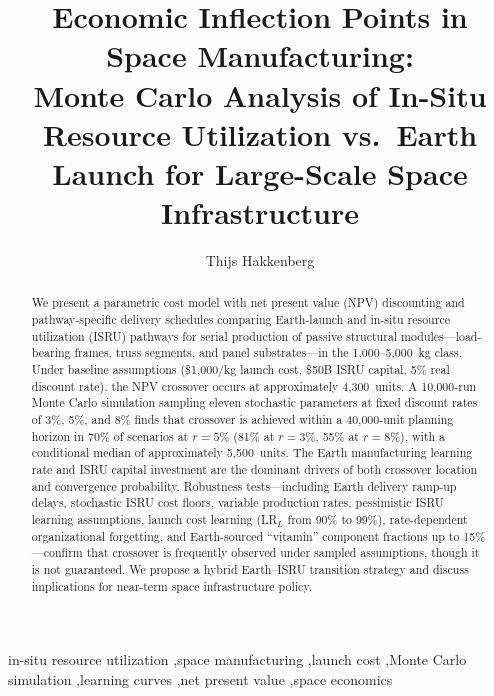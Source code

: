 \documentclass[preprint,12pt]{elsarticle}
\begin{document}
\begin{frontmatter}

\title{Economic Inflection Points in Space Manufacturing:\\ Monte Carlo Analysis of In-Situ Resource Utilization vs.\ Earth Launch for Large-Scale Space Infrastructure}

\author[dyson]{Thijs Hakkenberg}

\address[dyson]{Project Dyson, Open Research Initiative}

\begin{abstract}
We present a parametric cost model with net present value (NPV) discounting and pathway-specific delivery schedules comparing Earth-launch and in-situ resource utilization (ISRU) pathways for serial production of passive structural modules---load-bearing frames, truss segments, and panel substrates---in the 1{,}000--5{,}000~kg class. Under baseline assumptions (\$1{,}000/kg launch cost, \$50B ISRU capital, 5\% real discount rate), the NPV crossover occurs at approximately 4{,}300~units. A 10{,}000-run Monte Carlo simulation sampling eleven stochastic parameters at fixed discount rates of 3\%, 5\%, and 8\% finds that crossover is achieved within a 40{,}000-unit planning horizon in 70\% of scenarios at $r = 5\%$ (81\% at $r = 3\%$, 55\% at $r = 8\%$), with a conditional median of approximately 5{,}500~units. The Earth manufacturing learning rate and ISRU capital investment are the dominant drivers of both crossover location and convergence probability. Robustness tests---including Earth delivery ramp-up delays, stochastic ISRU cost floors, variable production rates, pessimistic ISRU learning assumptions, launch cost learning (LR$_L$ from 90\% to 99\%), rate-dependent organizational forgetting, and Earth-sourced ``vitamin'' component fractions up to 15\%---confirm that crossover is frequently observed under sampled assumptions, though it is not guaranteed. We propose a hybrid Earth--ISRU transition strategy and discuss implications for near-term space infrastructure policy.
\end{abstract}

\begin{keyword}
in-situ resource utilization \sep space manufacturing \sep launch cost \sep Monte Carlo simulation \sep learning curves \sep net present value \sep space economics
\end{keyword}

\end{frontmatter}
\end{document}
